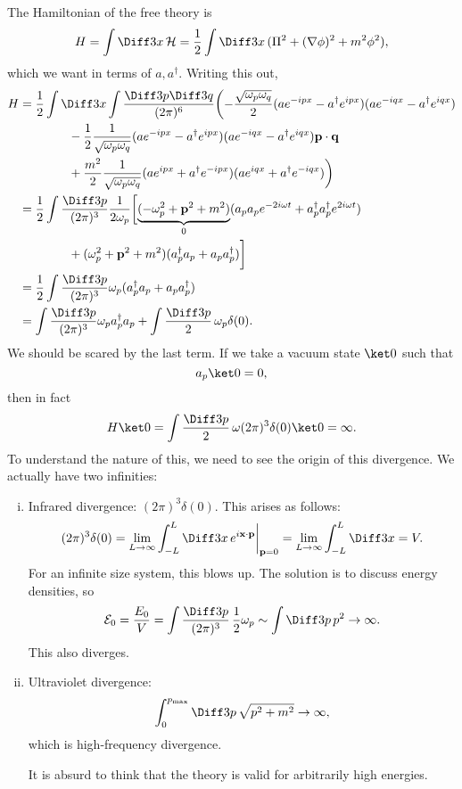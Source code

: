 \documentclass[12pt]{article}
\begin{document}
The Hamiltonian of the free theory is
\[
	H = \int \Diff3 x \, \mathcal{H} = \frac{1}{2} \int \Diff 3 x\,(\Pi^2 + (\nabla \phi)^2 + m^2 \phi^2),
\]
which we want in terms of $a, a^\dagger$. Writing this out,
\begin{align*}
	H &= \frac{1}{2} \int \Diff 3 x \int \frac{\Diff 3 p \Diff 3 q}{(2\pi)^6} \biggl( - \frac{\sqrt{\omega_p \omega_q}}{2} (a e^{-ipx} - a^{\dagger} e^{ipx})(ae^{-iqx} - a^{\dagger} e^{iqx}) \\
	  & \qquad \qquad - \frac{1}{2} \frac{1}{\sqrt{\omega_p \omega_q}} (a e^{-ipx} - a^{\dagger} e^{ipx})(a e^{-iqx} - a^\dagger e^{iqx}) \mathbf{p} \cdot \mathbf{q} \\
	  & \qquad \qquad + \frac{m^2}{2} \frac{1}{\sqrt{\omega_p \omega_q}} (a e^{ipx} + a^{\dagger} e^{-ipx})(ae^{iqx} + a^{\dagger} e^{-iqx}) \biggr) \\
	  &= \frac{1}{2} \int \frac{\Diff 3 p}{(2 \pi)^3} \frac{1}{2 \omega_p} \biggl[ \underbrace{(-\omega_p^2 + \mathbf{p}^2 + m^2)}_{0}(a_p a_p e^{-2i\omega t} + a_p^{\dagger} a_p^{\dagger} e^{2i\omega t}) \\
	  & \qquad \qquad + (\omega_p^2 + \mathbf{p}^2 + m^2)(a_p^\dagger a_p + a_p a_p^\dagger) \biggr] \\
	  &= \frac{1}{2} \int \frac{\Diff 3p}{(2 \pi)^3} \omega_p(a_p^\dagger a_p + a_p a_p^\dagger) \\
	  &= \int \frac{\Diff 3 p}{(2 \pi)^3} \omega_p a_p^\dagger a_p + \int \frac{\Diff 3 p}{2} \, \omega_p \delta(0).
\end{align*}
We should be scared by the last term. If we take a vacuum state $\ket 0$ such that
\[
a_p \ket 0 = 0,
\]
then in fact
\[
H \ket 0 = \int \frac{\Diff 3 p}{2} \, \omega (2 \pi)^3 \delta(0) \ket 0 = \infty.
\]
To understand the nature of this, we need to see the origin of this divergence. We actually have two infinities:
\begin{enumerate}[(i)]
	\item Infrared divergence: $(2 \pi)^3 \delta(0)$. This arises as follows:
		\[
			(2\pi)^3 \delta(0) = \lim_{L \to \infty} \int_{-L}^L \Diff 3 x \, e^{i \mathbf{x} \cdot \mathbf{p}} \biggr|_{\mathbf{p} = 0} = \lim_{L \to \infty} \int_{-L}^{L} \Diff 3 x = V.
		\]
		For an infinite size system, this blows up. The solution is to discuss energy densities, so
		\[
		\mathcal{E}_0 = \frac{E_0}{V} = \int \frac{\Diff 3p}{(2 \pi)^3} \, \frac{1}{2} \omega_p \sim \int \Diff 3 p \, p^{2} \to \infty.
		\]
		This also diverges.
	\item Ultraviolet divergence:
		\[
			\int_0^{p_{\mathrm{max}}} \Diff 3 p \, \sqrt{p^2 + m^2} \to \infty,
		\]
		which is high-frequency divergence.

		It is absurd to think that the theory is valid for arbitrarily high energies.
\end{enumerate}
\end{document}
